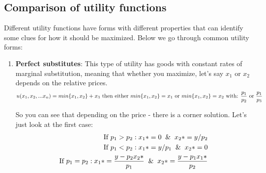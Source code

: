 \documentclass{article}
\begin{document}
\subsection{Comparison of utility functions}
Different utility functions have forms with different properties that can identify some clues for how it should be maximized. Below we go through common utility forms:
\begin{enumerate}

    \item \textbf{Perfect substitutes}:\label{perf} This type of utility has goods with constant rates of marginal substitution, meaning that whether you maximize, let's say $x_1$ or $x_2$ depends on the relative prices.
    \[
    u(x_1, x_2,...x_n) = min\{x_1, x_2\} + x_3 \\ 
    \text{ then either } min\{x_1, x_2\} = x_1 \text{ or } min\{x_1, x_2\} = x_2 \text{ with: } 
    \frac{p_1}{p_2} \text{ or } \frac{p_1}{p_3} \]

    So you can see that depending on the price - there is a corner solution. Let's just look at the first case:
    \begin{align}
    \text{If }  p_1 > p_2: x_1* = 0 \And x_2* = y/p_2 \\
    \text{If }  p_1 < p_2: x_1* = y/p_1 \And x_2* = 0 \\ 
    \text{If }  p_1 = p_2: x_1* = \frac{y - p_2x_2*}{p_1} \And x_2* = \frac{y - p_1x_1*}{p_2}
     \end{align}
    

\end{enumerate}
\end{document}
